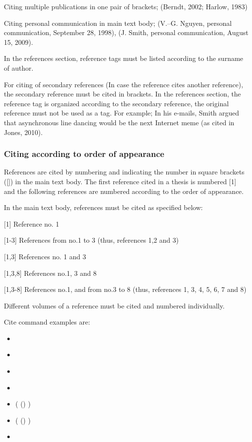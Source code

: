 Citing multiple publications in one pair of brackets; (Berndt, 2002; Harlow, 1983) 

Citing personal communication in main text body; (V.–G. Nguyen, personal communication, September 28, 1998), (J. Smith, personal communication, August 15, 2009).

In the references section, reference tags must be listed according to the surname of author. 

For citing of secondary references (In case the reference cites another reference), the secondary reference must be cited in brackets.  In the references section, the reference tag is organized according to the secondary reference, the original reference must not be used as a tag. For example; In his e-mails, Smith argued that asynchronous line dancing would be the next Internet meme (as cited in Jones, 2010).

\subsubsection{Citing according to order of appearance}

References are cited by numbering and indicating the number in square brackets ([]) in the main text body. The first reference cited in a thesis is numbered [1] and the following references are numbered according to the order of appearance.

In the main text body, references must be cited as specified below:

[1]	Reference no. 1

[1-3]	References from no.1 to 3 (thus, references 1,2 and 3)

[1,3]	References no. 1 and 3

[1,3,8]	References no.1, 3 and 8

[1,3-8]	References no.1, and from no.3 to 8 (thus, references 1, 3, 4, 5, 6, 7 and 8)

Different volumes of a reference must be cited and numbered individually.

Cite command examples are:

\begin{itemize}
    \item \cite{sisaky}
    \item \citep{sisaky}
    \item \citet{sisaky}
    \item \citet*{sisaky}
    \item (\citeauthor{sisaky} (\citeyear{sisaky}) \citep{sisaky})
    \item (\citeauthor*{sisaky} (\citeyear{sisaky}) \citep{sisaky})
    \item \citet[\chaptername\ \ref{ch:ch4}]{sisaky} 
  \end{itemize}

